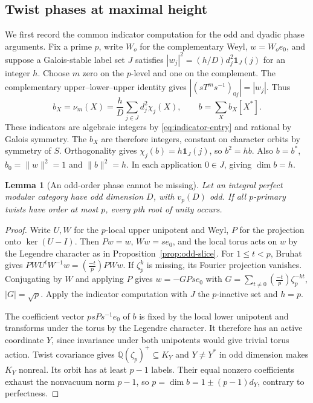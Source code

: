 \documentclass[11pt,a4paper]{article}
\numberwithin{equation}{section}
\newtheorem{lemma}[theorem]{Lemma}
\theoremstyle{remark}
\begin{document}
\subsection{Twist phases at maximal height}\label{fam:M:sec:7.2}

We first record the common indicator computation for the odd and dyadic phase arguments. Fix a prime $p$, write $W_o$ for the complementary Weyl, $w=W_oe_0$, and suppose a Galois-stable label set $J$ satisfies $|w_j|^2=(h/D)d_j^2\mathbf1_J(j)$ for an integer $h$. Choose $m$ zero on the $p$-level and one on the complement. The complementary upper--lower--upper identity gives $|(sT^ms^{-1})_{0j}|=|w_j|$. Thus
\[
 b_X=\nu_m(X)=\frac hD\sum_{j\in J}d_j^2\chi_j(X),
 \qquad b=\sum_X b_X[X^*].
\]
These indicators are algebraic integers by \eqref{eq:indicator-entry} and rational by Galois symmetry. The $b_X$ are therefore integers, constant on character orbits by symmetry of $S$. Orthogonality gives $\chi_j(b)=h\mathbf1_J(j)$, so $b^2=hb$. Also $b=b^*$, $b_0=\|w\|^2=1$ and $\|b\|^2=h$. In each application $0\in J$, giving $\dim b=h$.

\begin{lemma}[An odd-order phase cannot be missing]\label{fam:M:7.4}\label{seq:missing-odd}
Let an integral perfect modular category have odd dimension $D$, with
$v_p(D)$ odd. If all $p$-primary twists have order at most $p$,
every $p$th root of unity occurs.
\end{lemma}

\begin{proof}
Write $U,W$ for the $p$-local upper unipotent and Weyl, $P$ for the projection onto $\ker(U-I)$. Then $Pw=w$, $Ww=se_0$, and the local torus acts on $w$ by the Legendre character as in Proposition~\ref{prop:odd-slice}. For $1\le t<p$, Bruhat gives $PWU^tW^{-1}w=(\frac{-t}{p})PWw$. If $\zeta_p^k$ is missing, its Fourier projection vanishes. Conjugating by $W$ and applying $P$ gives $w=-G Pse_0$ with $G=\sum_{t\ne0}(\frac{-t}{p})\zeta_p^{-kt}$, $|G|=\sqrt p$. Apply the indicator computation with $J$ the $p$-inactive set and $h=p$.

The coefficient vector $p sP s^{-1}e_0$ of $b$ is fixed by the local lower unipotent and transforms under the torus by the Legendre character. It therefore has an active coordinate $Y$, since invariance under both unipotents would give trivial torus action. Twist covariance gives $\mathbb Q(\zeta_p)^+\subseteq K_Y$ and $Y\ne Y^*$ in odd dimension makes $K_Y$ nonreal. Its orbit has at least $p-1$ labels. Their equal nonzero coefficients exhaust the nonvacuum norm $p-1$, so $p=\dim b=1\pm(p-1)d_Y$, contrary to perfectness.
\end{proof}
\end{document}
